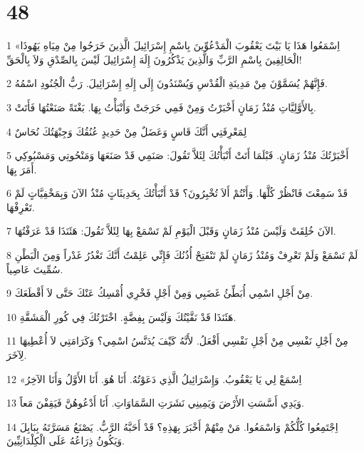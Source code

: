 \chapter{48}

\par 1 «اِسْمَعُوا هَذَا يَا بَيْتَ يَعْقُوبَ الْمَدْعُوِّينَ بِاسْمِ إِسْرَائِيلَ الَّذِينَ خَرَجُوا مِنْ مِيَاهِ يَهُوذَا الْحَالِفِينَ بِاسْمِ الرَّبِّ وَالَّذِينَ يَذْكُرُونَ إِلَهَ إِسْرَائِيلَ لَيْسَ بِالصِّدْقِ وَلاَ بِالْحَقِّ!
\par 2 فَإِنَّهُمْ يُسَمَّوْنَ مِنْ مَدِينَةِ الْقُدْسِ وَيُسْنَدُونَ إِلَى إِلَهِ إِسْرَائِيلَ. رَبُّ الْجُنُودِ اسْمُهُ.
\par 3 بِالأَوَّلِيَّاتِ مُنْذُ زَمَانٍ أَخْبَرْتُ وَمِنْ فَمِي خَرَجَتْ وَأَنْبَأْتُ بِهَا. بَغْتَةً صَنَعْتُهَا فَأَتَتْ.
\par 4 لِمَعْرِفَتِي أَنَّكَ قَاسٍ وَعَضَلٌ مِنْ حَدِيدٍ عُنُقُكَ وَجِبْهَتُكَ نُحَاسٌ
\par 5 أَخْبَرْتُكَ مُنْذُ زَمَانٍ. قَبْلَمَا أَتَتْ أَنْبَأْتُكَ لِئَلاَّ تَقُولَ: صَنَمِي قَدْ صَنَعَهَا وَمَنْحُوتِي وَمَسْبُوكِي أَمَرَ بِهَا.
\par 6 قَدْ سَمِعْتَ فَانْظُرْ كُلَّهَا. وَأَنْتُمْ أَلاَ تُخْبِرُونَ؟ قَدْ أَنْبَأْتُكَ بِحَدِيثَاتٍ مُنْذُ الآنَ وَبِمَخْفِيَّاتٍ لَمْ تَعْرِفْهَا.
\par 7 الآنَ خُلِقَتْ وَلَيْسَ مُنْذُ زَمَانٍ وَقَبْلَ الْيَوْمِ لَمْ تَسْمَعْ بِهَا لِئَلاَّ تَقُولَ: هَئَنَذَا قَدْ عَرَفْتُهَا.
\par 8 لَمْ تَسْمَعْ وَلَمْ تَعْرِفْ وَمُنْذُ زَمَانٍ لَمْ تَنْفَتِحْ أُذُنُكَ فَإِنِّي عَلِمْتُ أَنَّكَ تَغْدُرُ غَدْراً وَمِنَ الْبَطْنِ سُمِّيتَ عَاصِياً.
\par 9 مِنْ أَجْلِ اسْمِي أُبَطِّئُ غَضَبِي وَمِنْ أَجْلِ فَخْرِي أُمْسِكُ عَنْكَ حَتَّى لاَ أَقْطَعَكَ.
\par 10 هَئَنَذَا قَدْ نَقَّيْتُكَ وَلَيْسَ بِفِضَّةٍ. اخْتَرْتُكَ فِي كُورِ الْمَشَقَّةِ.
\par 11 مِنْ أَجْلِ نَفْسِي مِنْ أَجْلِ نَفْسِي أَفْعَلُ. لأَنَّهُ كَيْفَ يُدَنَّسُ اسْمِي؟ وَكَرَامَتِي لاَ أُعْطِيهَا لِآخَرَ.
\par 12 «اِسْمَعْ لِي يَا يَعْقُوبُ. وَإِسْرَائِيلُ الَّذِي دَعَوْتُهُ. أَنَا هُوَ. أَنَا الأَوَّلُ وَأَنَا الآخِرُ
\par 13 وَيَدِي أَسَّسَتِ الأَرْضَ وَيَمِينِي نَشَرَتِ السَّمَاوَاتِ. أَنَا أَدْعُوهُنَّ فَيَقِفْنَ مَعاً.
\par 14 اِجْتَمِعُوا كُلُّكُمْ وَاسْمَعُوا. مَنْ مِنْهُمْ أَخْبَرَ بِهَذِهِ؟ قَدْ أَحَبَّهُ الرَّبُّ. يَصْنَعُ مَسَرَّتَهُ بِبَابِلَ وَيَكُونُ ذِرَاعُهُ عَلَى الْكِلْدَانِيِّينَ.
